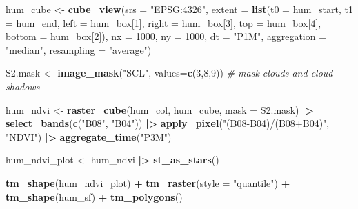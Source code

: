 \documentclass[
]{article}
\newenvironment{Shaded}{\begin{snugshade}}{\end{snugshade}}
\newcommand{\AttributeTok}[1]{\textcolor[rgb]{0.13,0.29,0.53}{#1}}
\newcommand{\CommentTok}[1]{\textcolor[rgb]{0.56,0.35,0.01}{\textit{#1}}}
\newcommand{\DecValTok}[1]{\textcolor[rgb]{0.00,0.00,0.81}{#1}}
\newcommand{\FunctionTok}[1]{\textcolor[rgb]{0.13,0.29,0.53}{\textbf{#1}}}
\newcommand{\NormalTok}[1]{#1}
\newcommand{\OtherTok}[1]{\textcolor[rgb]{0.56,0.35,0.01}{#1}}
\newcommand{\SpecialCharTok}[1]{\textcolor[rgb]{0.81,0.36,0.00}{\textbf{#1}}}
\newcommand{\StringTok}[1]{\textcolor[rgb]{0.31,0.60,0.02}{#1}}
\begin{document}
\begin{Shaded}
\begin{Highlighting}[]
\NormalTok{hum\_cube }\OtherTok{\textless{}{-}} \FunctionTok{cube\_view}\NormalTok{(}\AttributeTok{srs =} \StringTok{"EPSG:4326"}\NormalTok{,  }
                  \AttributeTok{extent =} \FunctionTok{list}\NormalTok{(}\AttributeTok{t0 =}\NormalTok{ hum\_start, }\AttributeTok{t1 =}\NormalTok{ hum\_end,}
                                \AttributeTok{left =}\NormalTok{ hum\_box[}\DecValTok{1}\NormalTok{], }\AttributeTok{right =}\NormalTok{ hum\_box[}\DecValTok{3}\NormalTok{],}
                                \AttributeTok{top =}\NormalTok{ hum\_box[}\DecValTok{4}\NormalTok{], }\AttributeTok{bottom =}\NormalTok{ hum\_box[}\DecValTok{2}\NormalTok{]),}
                  \AttributeTok{nx =} \DecValTok{1000}\NormalTok{, }\AttributeTok{ny =} \DecValTok{1000}\NormalTok{, }\AttributeTok{dt =} \StringTok{"P1M"}\NormalTok{,}
                  \AttributeTok{aggregation =} \StringTok{"median"}\NormalTok{, }\AttributeTok{resampling =} \StringTok{"average"}\NormalTok{)}

\NormalTok{S2.mask }\OtherTok{\textless{}{-}} \FunctionTok{image\_mask}\NormalTok{(}\StringTok{"SCL"}\NormalTok{, }\AttributeTok{values=}\FunctionTok{c}\NormalTok{(}\DecValTok{3}\NormalTok{,}\DecValTok{8}\NormalTok{,}\DecValTok{9}\NormalTok{)) }\CommentTok{\# mask clouds and cloud shadows}

\NormalTok{hum\_ndvi }\OtherTok{\textless{}{-}} 
  \FunctionTok{raster\_cube}\NormalTok{(hum\_col, hum\_cube, }\AttributeTok{mask =}\NormalTok{ S2.mask) }\SpecialCharTok{|\textgreater{}}
  \FunctionTok{select\_bands}\NormalTok{(}\FunctionTok{c}\NormalTok{(}\StringTok{"B08"}\NormalTok{, }\StringTok{"B04"}\NormalTok{)) }\SpecialCharTok{|\textgreater{}}
  \FunctionTok{apply\_pixel}\NormalTok{(}\StringTok{"(B08{-}B04)/(B08+B04)"}\NormalTok{, }\StringTok{"NDVI"}\NormalTok{) }\SpecialCharTok{|\textgreater{}} \FunctionTok{aggregate\_time}\NormalTok{(}\StringTok{"P3M"}\NormalTok{)}

\NormalTok{hum\_ndvi\_plot }\OtherTok{\textless{}{-}}\NormalTok{ hum\_ndvi }\SpecialCharTok{|\textgreater{}} \FunctionTok{st\_as\_stars}\NormalTok{()}

\FunctionTok{tm\_shape}\NormalTok{(hum\_ndvi\_plot) }\SpecialCharTok{+} \FunctionTok{tm\_raster}\NormalTok{(}\AttributeTok{style =} \StringTok{"quantile"}\NormalTok{) }\SpecialCharTok{+} \FunctionTok{tm\_shape}\NormalTok{(hum\_sf) }\SpecialCharTok{+} \FunctionTok{tm\_polygons}\NormalTok{()}
\end{Highlighting}
\end{Shaded}
\end{document}
